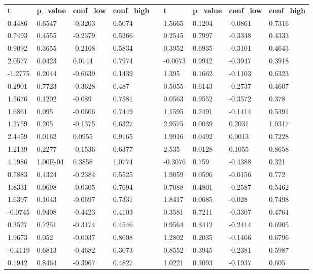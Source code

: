 \begin{table}[h!]
\small
\begin{tabular}{lllllllll}
\textbf{t} & \textbf{p\_value} & \textbf{conf\_low} & \textbf{conf\_high} &  & \textbf{t} & \textbf{p\_value} & \textbf{conf\_low} & \textbf{conf\_high} \\ \cline{1-4} \cline{6-9}
0.4486 & 0.6547 & -0.3203 & 0.5074 &  & 1.5665 & 0.1204 & -0.0861 & 0.7316 \\
0.7493 & 0.4555 & -0.2379 & 0.5266 &  & 0.2545 & 0.7997 & -0.3348 & 0.4333 \\
0.9092 & 0.3655 & -0.2168 & 0.5834 &  & 0.3952 & 0.6935 & -0.3101 & 0.4643 \\
2.0577 & 0.0423 & 0.0144 & 0.7974 &  & -0.0073 & 0.9942 & -0.3947 & 0.3918 \\
-1.2775 & 0.2044 & -0.6639 & 0.1439 &  & 1.395 & 0.1662 & -0.1103 & 0.6323 \\
0.2901 & 0.7723 & -0.3628 & 0.487 &  & 0.5055 & 0.6143 & -0.2737 & 0.4607 \\
1.5676 & 0.1202 & -0.089 & 0.7581 &  & 0.0563 & 0.9552 & -0.3572 & 0.378 \\
1.6861 & 0.095 & -0.0606 & 0.7449 &  & 1.1595 & 0.2491 & -0.1414 & 0.5391 \\
1.2759 & 0.205 & -0.1375 & 0.6327 &  & 2.9575 & 0.0039 & 0.2031 & 1.0317 \\
2.4459 & 0.0162 & 0.0955 & 0.9165 &  & 1.9916 & 0.0492 & 0.0013 & 0.7228 \\
1.2139 & 0.2277 & -0.1536 & 0.6377 &  & 2.535 & 0.0128 & 0.1055 & 0.8658 \\
4.1986 & 1.00E-04 & 0.3858 & 1.0774 &  & -0.3076 & 0.759 & -0.4388 & 0.321 \\
0.7883 & 0.4324 & -0.2384 & 0.5525 &  & 1.9059 & 0.0596 & -0.0156 & 0.772 \\
1.8331 & 0.0698 & -0.0305 & 0.7694 &  & 0.7088 & 0.4801 & -0.2587 & 0.5462 \\
1.6397 & 0.1043 & -0.0697 & 0.7331 &  & 1.8417 & 0.0685 & -0.028 & 0.7498 \\
-0.0745 & 0.9408 & -0.4423 & 0.4103 &  & 0.3581 & 0.7211 & -0.3307 & 0.4764 \\
0.3527 & 0.7251 & -0.3174 & 0.4546 &  & 0.9564 & 0.3412 & -0.2414 & 0.6905 \\
1.9673 & 0.052 & -0.0037 & 0.8608 &  & 1.2802 & 0.2035 & -0.1466 & 0.6796 \\
-0.4119 & 0.6813 & -0.4682 & 0.3073 &  & 0.8552 & 0.3945 & -0.2381 & 0.5987 \\
0.1942 & 0.8464 & -0.3967 & 0.4827 &  & 1.0221 & 0.3093 & -0.1937 & 0.605 \\

\end{tabular}
\end{table}
